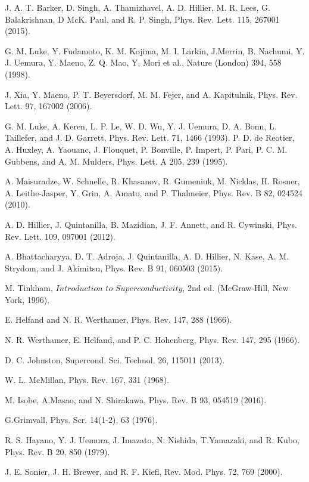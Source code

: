 \documentclass[reprint, superscriptaddress, secnumarabic, amssymb, nobibnotes, aps, prl]{revtex4-1}
\begin{document}
\begin{thebibliography}{References}
 J. A. T. Barker, D. Singh, A. Thamizhavel, A. D. Hillier, M. R. Lees, G. Balakrishnan, D McK. Paul, and R. P. Singh, Phys. Rev. Lett. 115, 267001 (2015).

 G. M. Luke, Y. Fudamoto, K. M. Kojima, M. I. Larkin, J.Merrin, B. Nachumi, Y. J. Uemura, Y. Maeno, Z. Q. Mao, Y. Mori et al., Nature (London) 394, 558 (1998).

 J. Xia, Y. Maeno, P. T. Beyersdorf, M. M. Fejer, and A. Kapitulnik, Phys. Rev. Lett. 97, 167002 (2006).

 G. M. Luke, A. Keren, L. P. Le, W. D. Wu, Y. J. Uemura, D. A. Bonn, L. Taillefer, and J. D. Garrett, Phys. Rev. Lett. 71, 1466 (1993).
 P. D. de Reotier, A. Huxley, A. Yaouanc, J. Flouquet, P. Bonville, P. Impert, P. Pari, P. C. M. Gubbens, and A. M. Mulders, Phys. Lett. A 205, 239 (1995).

 A. Maisuradze, W. Schnelle, R. Khasanov, R. Gumeniuk, M. Nicklas, H. Rosner, A. Leithe-Jasper, Y. Grin, A. Amato, and P. Thalmeier, Phys. Rev. B 82, 024524 (2010).

 A. D. Hillier, J. Quintanilla, B. Mazidian, J. F. Annett, and R. Cywinski, Phys. Rev. Lett. 109, 097001 (2012).

 A. Bhattacharyya, D. T. Adroja, J. Quintanilla, A. D. Hillier, N. Kase, A. M. Strydom, and J. Akimitsu, Phys. Rev. B 91, 060503 (2015).

 M. Tinkham, $\textit{Introduction to Superconductivity}$, 2nd ed. (McGraw-Hill, New York, 1996).

 E. Helfand and N. R. Werthamer, Phys. Rev. 147, 288 (1966).

 N. R. Werthamer, E. Helfand, and P. C. Hohenberg, Phys. Rev. 147, 295 (1966).

 D. C. Johnston, Supercond. Sci. Technol. 26, 115011 (2013).

 W. L. McMillan, Phys. Rev. 167, 331 (1968).

 M. Isobe, A.Masao, and N. Shirakawa, Phys. Rev. B 93, 054519 (2016).

 G.Grimvall, Phys. Scr. 14(1-2), 63 (1976).

 R. S. Hayano, Y. J. Uemura, J. Imazato, N. Nishida, T.Yamazaki, and R. Kubo, Phys. Rev. B 20, 850 (1979).

 J. E. Sonier, J. H. Brewer, and R. F. Kiefl, Rev. Mod. Phys. 72, 769 (2000).


\end{thebibliography}
\end{document}

